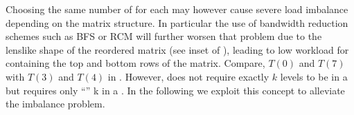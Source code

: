Choosing the same number of \levels for each \levelGroup may
however cause severe load imbalance depending on the matrix structure. In
particular the use of bandwidth reduction schemes such as BFS or RCM
will further worsen that problem due to the lenslike shape of the
reordered matrix (see inset of ), leading to low
workload for \levelGroups containing the top and bottom rows of the
  matrix. Compare, \eg $T(0)$ and $T(7)$ with $T(3)$ and $T(4)$ in
. However,  does not require
exactly $k$ levels to be in a \levelGroup but  
requires only ``\atleast'' k \levels in a \levelGroup. In
the following we exploit this concept to alleviate the imbalance
problem.
  
